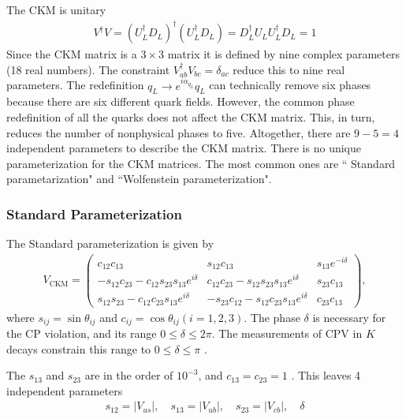 The CKM is unitary 
\begin{eqnarray}
V^{\dagger} V=\left(U_{L}^{\dagger} D_{L}\right)^{\dagger}\left(U_{L}^{\dagger} D_{L}\right)=D_{L}^{\dagger} U_{L} U_{L}^{\dagger} D_{L}=1
\end{eqnarray}
Since the CKM matrix is a $3\times 3$ matrix it is defined by nine complex parameters (18 real numbers). The constraint $V_{a b}^{\dagger} V_{b c}=\delta_{a c}$ reduce this to nine real parameters. The redefinition $q_{L} \rightarrow e^{i\alpha_{q_L}} q_{L}$ can technically remove six phases because there are six different quark fields. However, the common phase redefinition of all the quarks does not affect the CKM matrix. This, in turn, reduces the number of nonphysical phases to five. Altogether, there are $9-5=4$ independent parameters to describe the CKM matrix. There is no unique parameterization for the CKM matrices. The most common ones are `` Standard parametarization" \cite{Chau:1984fp} and ``Wolfenstein parameterization"\cite{Wolfenstein:1983yz}. 
\vspace{-0.3cm}
\subsubsection{Standard Parameterization }
\vspace{-0.3cm}
The Standard parameterization is given by
\begin{eqnarray}
V_{\text{CKM}}=\left(\begin{array}{ccc}{c_{12} c_{13}} & {s_{12} c_{13}} & {s_{13} e^{-i \delta}} \\ {-s_{12} c_{23}-c_{12} s_{23} s_{13} e^{i \delta}} & {c_{12} c_{23}-s_{12} s_{23} s_{13} e^{i \delta}} & {s_{23} c_{13}} \\ {s_{12} s_{23}-c_{12} c_{23} s_{13} e^{i \delta}} & {-s_{23} c_{12}-s_{12} c_{23} s_{13} e^{i \delta}} & {c_{23} c_{13}}\end{array}\right),
\end{eqnarray}
where $s_{ij}=\sin\theta_{ij}$ and $c_{ij}=\cos\theta_{ij}(i=1,2,3)$. The phase $\delta$ is necessary for the CP violation, and its range $0\leq \delta\leq 2\pi$. The measurements of CPV in $K$ decays constrain this range to $0\leq \delta\leq \pi$ \cite{Buras:1998raa}.\par
The $s_{13}$ and $s_{23}$ are in the order of $10^{-3}$, and $c_{13}=c_{23}=1$ \cite{Tanabashi:2018oca}. This leaves 4 independent parameters 
\begin{eqnarray}
s_{12}=\left|V_{u s}\right|, \quad s_{13}=\left|V_{u b}\right|, \quad s_{23}=\left|V_{c b}\right|, \quad \delta
\end{eqnarray}
